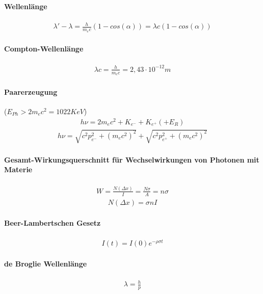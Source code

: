 \documentclass[10pt,a4paper]{article}
\begin{document}
\paragraph{Wellenlänge}$\,$ \\
\begin{align}
\lambda'-\lambda = \frac{h}{m_e c}(1-cos(\alpha))=\lambda c (1-cos(\alpha)) 
\end{align}
\paragraph{Compton-Wellenlänge}$\,$ \\
\begin{align}
\lambda c = \frac{h}{m_e c}= 2,43 \cdot 10^{-12} m
\end{align}
\paragraph{Paarerzeugung}($E_{Ph} > 2 m_e c^2 = 1022 KeV$) \\
\begin{align}
h\nu=2m_e c^2 + K_{e^-} + K_{e^+}(+E_R)
\end{align}
\begin{align}
h\nu = \sqrt{c^2p_{e^-}^2+(m_ec^2)^2}+\sqrt{c^2p_{e^+}^2+(m_ec^2)^2}
\end{align}
\paragraph{Gesamt-Wirkungsquerschnitt für Wechselwirkungen von Photonen mit Materie}$\,$ \\
\begin{align}
W=\frac{N(\Delta x)}{I}= \frac{N \sigma}{A} = n\sigma
\end{align}
\begin{align}
N(\Delta x)=\sigma n I
\end{align}
\paragraph{Beer-Lambertschen Gesetz}$\,$ \\
\begin{align}
I(t) = I(0) e^{-\rho \sigma t}
\end{align}
\paragraph{de Broglie Wellenlänge}$\,$ \\
\begin{align}
\lambda =\frac{h}{p}
\end{align}
\end{document}
